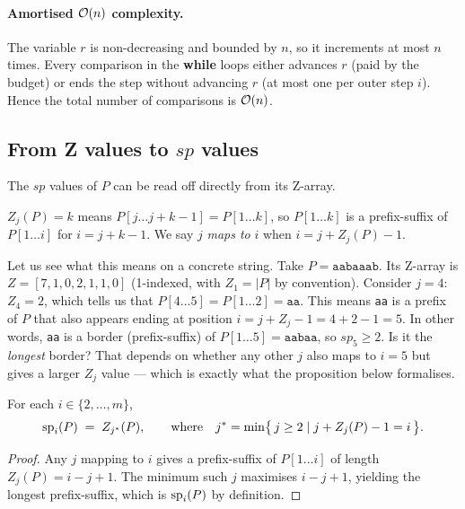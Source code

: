 \paragraph{Amortised $\mathcal{O}\!\left(n\right)$ complexity.}
The variable $r$ is non-decreasing and bounded by $n$, so it increments at most $n$ times.
Every comparison in the \textbf{while} loops either advances $r$ (paid by the budget) or
ends the step without advancing $r$ (at most one per outer step $i$).
Hence the total number of comparisons is $\mathcal{O}\!\left(n\right)$.

\subsection{From Z values to $sp$ values}
\label{sec:z-to-sp}

The $sp$ values of $P$ can be read off directly from its Z-array.

\begin{observation}
  $Z_j(P) = k$ means $P[j \ldots j+k-1] = P[1 \ldots k]$, so $P[1\ldots k]$ is a
  prefix-suffix of $P[1\ldots i]$ for $i = j + k - 1$.
  We say $j$ \emph{maps to} $i$ when $i = j + Z_j(P) - 1$.
\end{observation}

Let us see what this means on a concrete string.
Take $P = \texttt{aabaaab}$.
Its Z-array is $Z = [7, 1, 0, 2, 1, 1, 0]$ (1-indexed, with $Z_1 = |P|$
by convention).
Consider $j = 4$: $Z_4 = 2$, which tells us that
$P[4\ldots5] = P[1\ldots2] = \texttt{aa}$.
This means \texttt{aa} is a prefix of $P$ that also appears ending at
position $i = j + Z_j - 1 = 4 + 2 - 1 = 5$.
In other words, \texttt{aa} is a border (prefix-suffix) of $P[1\ldots5]
= \texttt{aabaa}$, so $sp_5 \ge 2$.
Is it the \emph{longest} border?
That depends on whether any other $j$ also maps to $i = 5$ but gives a
larger $Z_j$ value --- which is exactly what the proposition below
formalises.

\begin{proposition}
  \label{prop:sp-from-Z}
  For each $i \in \{2, \ldots, m\}$,
  \[
    \mathrm{sp}_{i}(P) \;=\; Z_{j^*}(P),
    \qquad\text{where}\quad
    j^* = \min\bigl\{\, j \geq 2 \mid j + Z_j(P) - 1 = i \,\bigr\}.
  \]
\end{proposition}

\begin{proof}
  Any $j$ mapping to $i$ gives a prefix-suffix of $P[1\ldots i]$ of length
  $Z_j(P) = i - j + 1$.
  The minimum such $j$ maximises $i - j + 1$, yielding the longest prefix-suffix, which is
  $\mathrm{sp}_{i}(P)$ by definition.
\end{proof}

